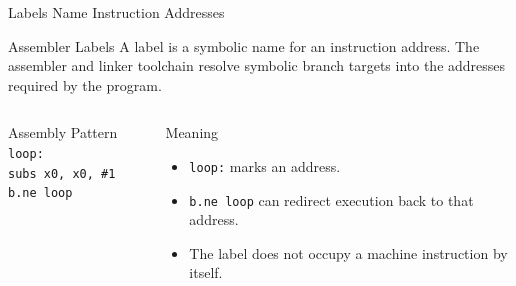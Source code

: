 \documentclass[aspectratio=169,11pt,t]{beamer}
\newcommand{\code}[1]{\texttt{#1}}
\newcommand{\codeline}[1]{\hspace{0.7cm}\code{#1}}
\begin{document}



\begin{frame}{Labels Name Instruction Addresses}
\begin{block}{Assembler Labels}
A label is a symbolic name for an instruction address. The assembler and linker toolchain resolve symbolic branch targets into the addresses required by the program.
\end{block}
\vspace{0.2cm}
\begin{columns}[T,onlytextwidth]
\begin{block}{Assembly Pattern}
\large
\codeline{loop:}\\[0.10cm]
\hspace{1.2cm}\code{subs x0, x0, \#1}\\[0.10cm]
\hspace{1.2cm}\code{b.ne loop}
\normalsize
\end{block}
\begin{block}{Meaning}
\begin{itemize}
\item \code{loop:} marks an address.
\item \code{b.ne loop} can redirect execution back to that address.
\item The label does not occupy a machine instruction by itself.
\end{itemize}
\end{block}
\end{columns}
\end{frame}



\end{document}
